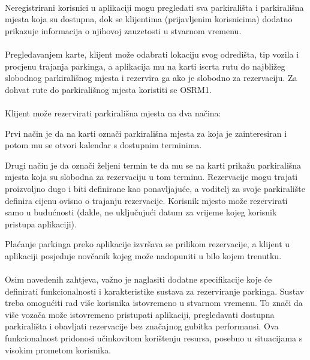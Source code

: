 \paragraph*{}{Neregistrirani korisnici u aplikaciji mogu pregledati sva parkirališta i parkirališna mjesta koja su dostupna, dok se klijentima (prijavljenim korisnicima) dodatno prikazuje informacija o njihovoj zauzetosti u stvarnom vremenu.}
\paragraph*{}{Pregledavanjem karte, klijent može odabrati lokaciju svog odredišta, tip vozila i procjenu trajanja parkinga, a aplikacija mu na karti iscrta rutu do najbližeg slobodnog parkirališnog mjesta i rezervira ga ako je slobodno za rezervaciju. Za dohvat rute do parkirališnog mjesta koristiti se OSRM1.}

\paragraph*{}Klijent može rezervirati parkirališna mjesta na dva načina:
\begin{packed_item}
	\item{
		Prvi način je da na karti označi parkirališna mjesta za koja je zainteresiran i potom mu se otvori kalendar s dostupnim terminima.
	}
	\item{
		Drugi način je da označi željeni termin te da mu se na karti prikažu parkirališna mjesta koja su slobodna za rezervaciju u tom terminu. Rezervacije mogu trajati proizvoljno dugo i biti definirane kao ponavljajuće, a voditelj za svoje parkiralište definira cijenu ovisno o trajanju rezervacije. Korisnik mjesto može rezervirati samo u budućnosti (dakle, ne uključujući datum za vrijeme kojeg korisnik pristupa aplikaciji).
	}
\end{packed_item}


Plaćanje parkinga preko aplikacije izvršava se prilikom rezervacije, a klijent u aplikaciji posjeduje novčanik kojeg može nadopuniti u bilo kojem trenutku.


\paragraph*{}{Osim navedenih zahtjeva, važno je naglasiti dodatne specifikacije koje će definirati funkcionalnosti i karakteristike sustava za rezerviranje parkinga. Sustav treba omogućiti rad više korisnika istovremeno u stvarnom vremenu. To znači da više vozača može istovremeno pristupati aplikaciji, pregledavati dostupna parkirališta i obavljati rezervacije bez značajnog gubitka performansi. Ova funkcionalnost pridonosi učinkovitom korištenju resursa, posebno u situacijama s visokim prometom korisnika. }

